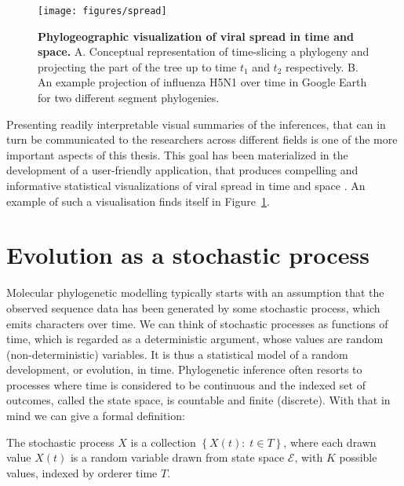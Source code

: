 \begin{figure}[H]
\centering
\texttt{[image: figures/spread]}
\caption{
{ \footnotesize 
{\bf Phylogeographic visualization of viral spread in time and space.} 
A. Conceptual representation of time-slicing a phylogeny and projecting the part of the tree up to time $t_{1}$ and $t_{2}$ respectively. B. An example projection of influenza H5N1 over time in Google Earth for two different segment phylogenies. %
} %
}
\label{fig:spread}
\end{figure}

Presenting readily interpretable visual summaries of the inferences, that can in turn be communicated to the researchers across different fields is one of the more important aspects of this thesis.
This goal has been materialized in the development of a user-friendly application, that produces compelling and informative statistical visualizations of viral spread in time and space \citep{Bielejec2011}.
An example of such a visualisation finds itself in Figure~\ref{fig:spread}.

\section{Evolution as a stochastic process}

Molecular phylogenetic modelling typically starts with an assumption that the observed sequence data has been generated by some stochastic process, which emits characters over time.
We can think of stochastic processes as functions of time, which is regarded as a deterministic argument, whose values are random (non-deterministic) variables. 
It is thus a statistical model of a random development, or evolution, in time.
Phylogenetic inference often resorts to processes where time is considered to be continuous and the indexed set of outcomes, called the state space, is countable and finite (discrete).
With that in mind we can give a formal definition:

\begin{definition} 
The stochastic process $X$ is a collection $\left\{ X(t):\; t\in T\right\} $, where each drawn value $X(t)$ is a random variable drawn from state space $\mathcal{E}$, with $K$ possible values, indexed by orderer time $T$.
\label{def:stochasticProc}
\end{definition} 

